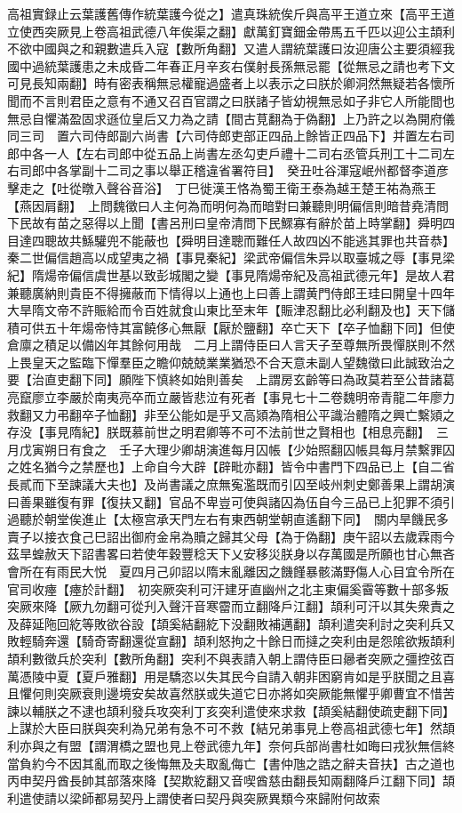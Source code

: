 高祖實録止云葉護舊傳作統葉護今從之】遣真珠統俟斤與高平王道立來【高平王道立使西突厥見上卷高祖武德八年俟渠之翻】獻萬釘寶鈿金帶馬五千匹以迎公主頡利不欲中國與之和親數遣兵入寇【數所角翻】又遣人謂統葉護曰汝迎唐公主要須經我國中過統葉護患之未成昏二年春正月辛亥右僕射長孫無忌罷【從無忌之請也考下文可見長知兩翻】時有密表稱無忌權寵過盛者上以表示之曰朕於卿洞然無疑若各懷所聞而不言則君臣之意有不通又召百官謂之曰朕諸子皆幼視無忌如子非它人所能間也無忌自懼滿盈固求遜位皇后又力為之請【間古莧翻為于偽翻】上乃許之以為開府儀同三司　置六司侍郎副六尚書【六司侍郎吏部正四品上餘皆正四品下】并置左右司郎中各一人【左右司郎中從五品上尚書左丞勾吏戶禮十二司右丞管兵刑工十二司左右司郎中各掌副十二司之事以舉正稽違省署符目】　癸丑吐谷渾寇岷州都督李道彦擊走之【吐從暾入聲谷音浴】　丁巳徙漢王恪為蜀王衛王泰為越王楚王祐為燕王【燕因肩翻】　上問魏徵曰人主何為而明何為而暗對曰兼聽則明偏信則暗昔堯清問下民故有苗之惡得以上聞【書呂刑曰皇帝清問下民鰥寡有辭於苗上時掌翻】舜明四目達四聰故共鯀驩兜不能蔽也【舜明目達聰而難任人故四凶不能逃其罪也共音恭】秦二世偏信趙高以成望夷之禍【事見秦紀】梁武帝偏信朱异以取臺城之辱【事見梁紀】隋煬帝偏信虞世基以致彭城閣之變【事見隋煬帝紀及高祖武德元年】是故人君兼聽廣納則貴臣不得擁蔽而下情得以上通也上曰善上謂黄門侍郎王珪曰開皇十四年大旱隋文帝不許賑給而令百姓就食山東比至末年【賑津忍翻比必利翻及也】天下儲積可供五十年煬帝恃其富饒侈心無厭【厭於鹽翻】卒亡天下【卒子恤翻下同】但使倉廪之積足以備凶年其餘何用哉　二月上謂侍臣曰人言天子至尊無所畏憚朕則不然上畏皇天之監臨下憚羣臣之瞻仰兢兢業業猶恐不合天意未副人望魏徵曰此誠致治之要【治直吏翻下同】願陛下慎終如始則善矣　上謂房玄齡等曰為政莫若至公昔諸葛亮竄廖立李嚴於南夷亮卒而立嚴皆悲泣有死者【事見七十二卷魏明帝青龍二年廖力救翻又力弔翻卒子恤翻】非至公能如是乎又高熲為隋相公平識治體隋之興亡繫熲之存没【事見隋紀】朕既慕前世之明君卿等不可不法前世之賢相也【相息亮翻】　三月戊寅朔日有食之　壬子大理少卿胡演進每月囚帳【少始照翻囚帳具每月禁繫罪囚之姓名猶今之禁歷也】上命自今大辟【辟毗亦翻】皆令中書門下四品已上【自二省長貳而下至諫議大夫也】及尚書議之庶無寃濫既而引囚至岐州刺史鄭善果上謂胡演曰善果雖復有罪【復扶又翻】官品不卑豈可使與諸囚為伍自今三品已上犯罪不須引過聽於朝堂俟進止【太極宫承天門左右有東西朝堂朝直遙翻下同】　關内旱饑民多賣子以接衣食己巳詔出御府金帛為贖之歸其父母【為于偽翻】庚午詔以去歲霖雨今茲旱蝗赦天下詔書畧曰若使年穀豐稔天下乂安移災朕身以存萬國是所願也甘心無吝會所在有雨民大悦　夏四月己卯詔以隋末亂離因之饑饉暴骸滿野傷人心目宜令所在官司收瘞【瘞於計翻】　初突厥突利可汗建牙直幽州之北主東偏奚霫等數十部多叛突厥來降【厥九勿翻可從刋入聲汗音寒霤而立翻降戶江翻】頡利可汗以其失衆責之及薛延陁回紇等敗欲谷設【頡奚結翻紇下没翻敗補邁翻】頡利遣突利討之突利兵又敗輕騎奔還【騎奇寄翻還從宣翻】頡利怒拘之十餘日而撻之突利由是怨隂欲叛頡利頡利數徵兵於突利【數所角翻】突利不與表請入朝上謂侍臣曰曏者突厥之彊控弦百萬憑陵中夏【夏戶雅翻】用是驕恣以失其民今自請入朝非困窮肯如是乎朕聞之且喜且懼何則突厥衰則邊境安矣故喜然朕或失道它日亦將如突厥能無懼乎卿曹宜不惜苦諫以輔朕之不逮也頡利發兵攻突利丁亥突利遣使來求救【頡奚結翻使疏吏翻下同】上謀於大臣曰朕與突利為兄弟有急不可不救【結兄弟事見上卷高祖武德七年】然頡利亦與之有盟【謂渭橋之盟也見上卷武德九年】奈何兵部尚書杜如晦曰戎狄無信終當負約今不因其亂而取之後悔無及夫取亂侮亡【書仲虺之誥之辭夫音扶】古之道也丙申契丹酋長帥其部落來降【契欺紇翻又音喫酋慈由翻長知兩翻降戶江翻下同】頡利遣使請以梁師都易契丹上謂使者曰契丹與突厥異類今來歸附何故索